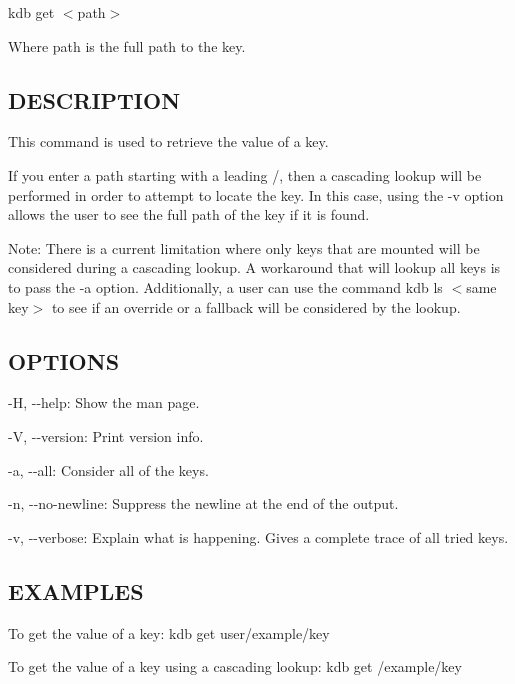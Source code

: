 {\ttfamily kdb get $<$path$>$}

Where {\ttfamily path} is the full path to the key.

\subsection*{D\+E\+S\+C\+R\+I\+P\+T\+I\+O\+N}

This command is used to retrieve the value of a key.

If you enter a {\ttfamily path} starting with a leading {\ttfamily /}, then a cascading lookup will be performed in order to attempt to locate the key. In this case, using the {\ttfamily -\/v} option allows the user to see the full {\ttfamily path} of the key if it is found.

Note\+: There is a current limitation where only keys that are mounted will be considered during a cascading lookup. A workaround that will lookup all keys is to pass the {\ttfamily -\/a} option. Additionally, a user can use the command {\ttfamily kdb ls $<$same key$>$} to see if an override or a fallback will be considered by the lookup.

\subsection*{O\+P\+T\+I\+O\+N\+S}


\begin{DoxyItemize}
\item {\ttfamily -\/\+H}, {\ttfamily -\/-\/help}\+: Show the man page.
\item {\ttfamily -\/\+V}, {\ttfamily -\/-\/version}\+: Print version info.
\item {\ttfamily -\/a}, {\ttfamily -\/-\/all}\+: Consider all of the keys.
\item {\ttfamily -\/n}, {\ttfamily -\/-\/no-\/newline}\+: Suppress the newline at the end of the output.
\item {\ttfamily -\/v}, {\ttfamily -\/-\/verbose}\+: Explain what is happening. Gives a complete trace of all tried keys.
\end{DoxyItemize}

\subsection*{E\+X\+A\+M\+P\+L\+E\+S}

To get the value of a key\+: {\ttfamily kdb get user/example/key}

To get the value of a key using a cascading lookup\+: {\ttfamily kdb get /example/key}

